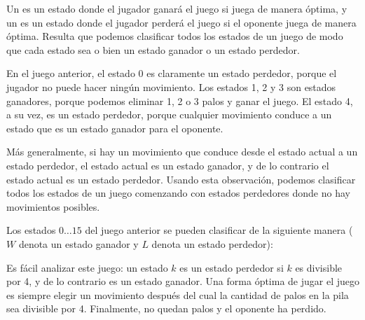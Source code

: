 Un  es un estado donde
el jugador ganará el juego si
juega de manera óptima,
y un  es un estado
donde el jugador perderá el juego si el
oponente juega de manera óptima.
Resulta que podemos clasificar todos los estados
de un juego de modo que cada estado sea o bien
un estado ganador o un estado perdedor.

En el juego anterior, el estado 0 es claramente un
estado perdedor, porque el jugador no puede hacer
ningún movimiento.
Los estados 1, 2 y 3 son estados ganadores,
porque podemos eliminar 1, 2 o 3 palos
y ganar el juego.
El estado 4, a su vez, es un estado perdedor,
porque cualquier movimiento conduce a un estado que
es un estado ganador para el oponente.

Más generalmente, si hay un movimiento que conduce
desde el estado actual a un estado perdedor,
el estado actual es un estado ganador,
y de lo contrario el estado actual es un estado perdedor.
Usando esta observación, podemos clasificar todos los estados
de un juego comenzando con estados perdedores donde
no hay movimientos posibles.

Los estados $0 \ldots 15$ del juego anterior
se pueden clasificar de la siguiente manera
($W$ denota un estado ganador y $L$ denota un estado perdedor):
\begin{center}
\end{center}

Es fácil analizar este juego:
un estado $k$ es un estado perdedor si $k$ es
divisible por 4, y de lo contrario es
un estado ganador.
Una forma óptima de jugar el juego es
siempre elegir un movimiento después del cual
la cantidad de palos en la pila
sea divisible por 4.
Finalmente, no quedan palos y
el oponente ha perdido.

